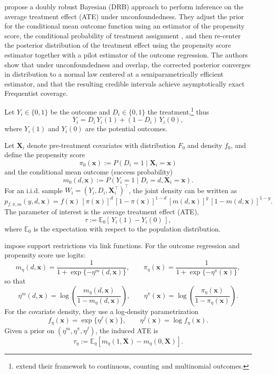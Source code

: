 \cite{breunig2025double} propose a doubly robust Bayesian (DRB) approach to perform inference on the average treatment effect (ATE) under unconfoundedness. They adjust the prior for the conditional mean outcome function using an estimator of the propensity score, the conditional probability of treatment assignment \cite{rosenbaum1983central}, and then re-center the posterior distribution of the treatment effect using the propensity score estimator together with a pilot estimator of the outcome regression. The authors show that under unconfoundedness and overlap, the corrected posterior converges in distribution to a normal law centered at a semiparametrically efficient estimator, and that the resulting credible intervals achieve asymptotically exact Frequentist coverage.

Let $Y_i\in\{0,1\}$ be the outcome and $D_i\in\{0,1\}$ the treatment,\footnote{\cite{breunig2025double} extend their framework to continuous, counting and multinomial outcomes.} thus
\[
Y_i = D_i\,Y_i(1) + (1-D_i)\,Y_i(0),
\]
where $Y_i(1)$ and $Y_i(0)$ are the potential outcomes.

Let $\mathbf{X}_i$ denote pre-treatment covariates with distribution $F_0$ and density $f_0$, and define the propensity score
\[
\pi_0(\mathbf{x}) := P(D_i=1\mid \mathbf{X}_i=\mathbf{x})
\]
and the conditional mean outcome (success probability)
\[
m_0(d,\mathbf{x}) := P(Y_i=1\mid D_i=d,\mathbf{X}_i=\mathbf{x}).
\]
For an i.i.d. sample $W_i=(Y_i,D_i,\mathbf{X}_i^{\top})^{\top}$, the joint density can be written as
\[
p_{f,\pi,m}(y,d,\mathbf{x})
= f(\mathbf{x})\,[\pi(\mathbf{x})]^d\,[1-\pi(\mathbf{x})]^{1-d}\,[m(d,\mathbf{x})]^y\,[1-m(d,\mathbf{x})]^{1-y}.
\]
The parameter of interest is the average treatment effect (ATE),
\[
\tau := \mathbb{E}_0\!\left[\,Y_i(1)-Y_i(0)\,\right],
\]
where $\mathbb{E}_0$ is the expectation with respect to the population distribution.

\cite{breunig2025double} impose support restrictions via link functions. For the outcome regression and propensity score use logits:
\[
m_\eta(d,\mathbf{x})=\frac{1}{1+\exp\{-\eta^m(d,\mathbf{x})\}},
\qquad
\pi_\eta(\mathbf{x})=\frac{1}{1+\exp\{-\eta^\pi(\mathbf{x})\}},
\]
so that
\[
\eta^m(d,\mathbf{x})=\log\!\left(\frac{m_\eta(d,\mathbf{x})}{1-m_\eta(d,\mathbf{x})}\right),
\qquad
\eta^\pi(\mathbf{x})=\log\!\left(\frac{\pi_\eta(\mathbf{x})}{1-\pi_\eta(\mathbf{x})}\right).
\]
For the covariate density, they use a log-density parametrization
\[
f_\eta(\mathbf{x})=\exp\{\eta^f(\mathbf{x})\},
\qquad
\eta^f(\mathbf{x})=\log f_\eta(\mathbf{x}).
\]
Given a prior on $(\eta^m,\eta^\pi,\eta^f)$, the induced ATE is
\[
\tau_\eta := \mathbb{E}_\eta\!\left[m_\eta(1,\mathbf{X})-m_\eta(0,\mathbf{X})\right].
\]


